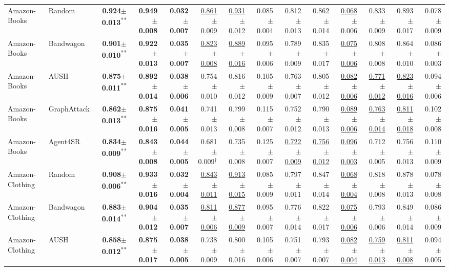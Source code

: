 \begin{table}[t]
\begin{tabular}{llrrrrrrrrrrrr}
\midrule
Amazon-Books & Random & \textbf{0.924$\pm$0.013}\textsuperscript{**} & \textbf{0.949$\pm$0.008} & \textbf{0.032$\pm$0.007} & \underline{0.861$\pm$0.009} & \underline{0.931$\pm$0.012} & 0.085$\pm$0.004 & 0.812$\pm$0.013 & 0.862$\pm$0.014 & \underline{0.068$\pm$0.006} & 0.833$\pm$0.009 & 0.893$\pm$0.017 & 0.078$\pm$0.009 \\
Amazon-Books & Bandwagon & \textbf{0.901$\pm$0.010}\textsuperscript{**} & \textbf{0.922$\pm$0.013} & \textbf{0.035$\pm$0.007} & \underline{0.823$\pm$0.008} & \underline{0.889$\pm$0.016} & 0.095$\pm$0.006 & 0.789$\pm$0.009 & 0.835$\pm$0.017 & \underline{0.075$\pm$0.006} & 0.808$\pm$0.008 & 0.864$\pm$0.010 & 0.086$\pm$0.003 \\
Amazon-Books & AUSH & \textbf{0.875$\pm$0.011}\textsuperscript{**} & \textbf{0.892$\pm$0.014} & \textbf{0.038$\pm$0.006} & 0.754$\pm$0.010 & 0.816$\pm$0.012 & 0.105$\pm$0.009 & 0.763$\pm$0.007 & 0.805$\pm$0.012 & \underline{0.082$\pm$0.006} & \underline{0.771$\pm$0.012} & \underline{0.823$\pm$0.016} & 0.094$\pm$0.006 \\
Amazon-Books & GraphAttack & \textbf{0.862$\pm$0.013}\textsuperscript{**} & \textbf{0.875$\pm$0.016} & \textbf{0.041$\pm$0.005} & 0.741$\pm$0.013 & 0.799$\pm$0.008 & 0.115$\pm$0.007 & 0.752$\pm$0.012 & 0.790$\pm$0.013 & \underline{0.089$\pm$0.006} & \underline{0.763$\pm$0.014} & \underline{0.811$\pm$0.018} & 0.102$\pm$0.008 \\
Amazon-Books & Agent4SR & \textbf{0.834$\pm$0.009}\textsuperscript{**} & \textbf{0.843$\pm$0.008} & \textbf{0.044$\pm$0.005} & 0.681$\pm$0.009$^\dag$ & 0.735$\pm$0.008 & 0.125$\pm$0.007 & \underline{0.722$\pm$0.009} & \underline{0.756$\pm$0.012} & \underline{0.096$\pm$0.003} & 0.712$\pm$0.005 & 0.756$\pm$0.013 & 0.110$\pm$0.009 \\
\midrule
Amazon-Clothing & Random & \textbf{0.908$\pm$0.006}\textsuperscript{**} & \textbf{0.933$\pm$0.016} & \textbf{0.032$\pm$0.004} & \underline{0.843$\pm$0.011} & \underline{0.913$\pm$0.015} & 0.085$\pm$0.009 & 0.797$\pm$0.011 & 0.847$\pm$0.014 & \underline{0.068$\pm$0.004} & 0.818$\pm$0.008 & 0.878$\pm$0.013 & 0.078$\pm$0.008 \\
Amazon-Clothing & Bandwagon & \textbf{0.883$\pm$0.014}\textsuperscript{**} & \textbf{0.904$\pm$0.012} & \textbf{0.035$\pm$0.007} & \underline{0.811$\pm$0.006} & \underline{0.877$\pm$0.009} & 0.095$\pm$0.007 & 0.776$\pm$0.014 & 0.822$\pm$0.017 & \underline{0.075$\pm$0.006} & 0.793$\pm$0.006 & 0.849$\pm$0.014 & 0.086$\pm$0.009 \\
Amazon-Clothing & AUSH & \textbf{0.858$\pm$0.012}\textsuperscript{**} & \textbf{0.875$\pm$0.017} & \textbf{0.038$\pm$0.005} & 0.738$\pm$0.009 & 0.800$\pm$0.016 & 0.105$\pm$0.006 & 0.751$\pm$0.007 & 0.793$\pm$0.007 & \underline{0.082$\pm$0.004} & \underline{0.759$\pm$0.013} & \underline{0.811$\pm$0.008} & 0.094$\pm$0.005 \\

\end{tabular}
\end{table}
